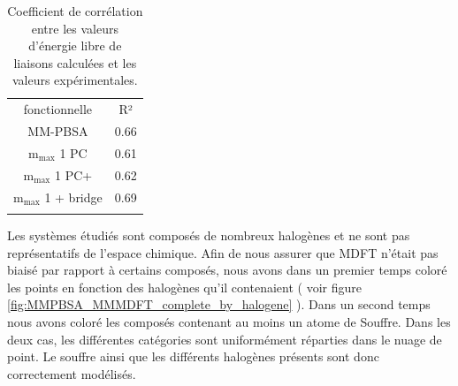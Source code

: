\begin{table}[H]
  \begin{center}
    \begin{tabular}{ c c }
      \hline & \\[-1em]\hline
       fonctionnelle  & R²  \\
      \hline
       MM-PBSA  & 0.66 \\
       $\mathrm{m}_\mathrm{max}$ 1 PC  & 0.61  \\
       $\mathrm{m}_\mathrm{max}$ 1 PC+  & 0.62  \\
       $\mathrm{m}_\mathrm{max}$ 1 + bridge  & 0.69  \\
      \hline & \\[-1em]\hline%
    \end{tabular}
  \end{center}
  \caption{Coefficient de corrélation entre les valeurs d'énergie libre de liaisons calculées et les valeurs expérimentales.}
  \label{tab:MMPBSA_correlation}  
\end{table}


Les systèmes étudiés sont composés de nombreux halogènes et ne sont pas représentatifs de l'espace chimique. Afin de nous assurer que MDFT n'était pas biaisé par rapport à certains composés, nous avons dans un premier temps coloré les points en fonction des halogènes qu'il contenaient ( voir figure \ref{fig:MMPBSA_MMMDFT_complete_by_halogene} ). Dans un second temps nous avons coloré les composés contenant au moins un atome de Souffre. Dans les deux cas, les différentes catégories sont uniformément réparties dans le nuage de point. Le souffre ainsi que les différents halogènes présents sont donc correctement modélisés.


